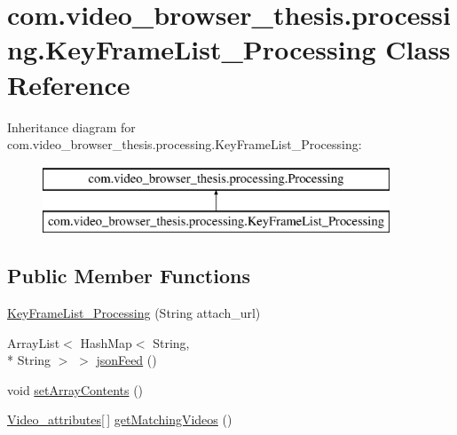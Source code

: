\hypertarget{classcom_1_1video__browser__thesis_1_1processing_1_1_key_frame_list___processing}{\section{com.\-video\-\_\-browser\-\_\-thesis.\-processing.\-Key\-Frame\-List\-\_\-\-Processing Class Reference}
\label{classcom_1_1video__browser__thesis_1_1processing_1_1_key_frame_list___processing}
}
Inheritance diagram for com.\-video\-\_\-browser\-\_\-thesis.\-processing.\-Key\-Frame\-List\-\_\-\-Processing\-:\begin{figure}[H]
\begin{center}
\leavevmode
\includegraphics[height=2.000000cm]{classcom_1_1video__browser__thesis_1_1processing_1_1_key_frame_list___processing}
\end{center}
\end{figure}
\subsection*{Public Member Functions}
\begin{DoxyCompactItemize}
\item 
\hyperlink{classcom_1_1video__browser__thesis_1_1processing_1_1_key_frame_list___processing_aa997cba0b20aceb81bff4f6ff3ee2822}{Key\-Frame\-List\-\_\-\-Processing} (String attach\-\_\-url)
\item 
Array\-List$<$ Hash\-Map$<$ String, \\*
String $>$ $>$ \hyperlink{classcom_1_1video__browser__thesis_1_1processing_1_1_key_frame_list___processing_a043be842a8cda34fd7f80025fb13e7ce}{json\-Feed} ()
\item 
void \hyperlink{classcom_1_1video__browser__thesis_1_1processing_1_1_key_frame_list___processing_ac86e187eb01b3c5d9224bb2139b0979d}{set\-Array\-Contents} ()
\item 
\hyperlink{classcom_1_1video__browser__thesis_1_1elements_1_1_video__attributes}{Video\-\_\-attributes}\mbox{[}$\,$\mbox{]} \hyperlink{classcom_1_1video__browser__thesis_1_1processing_1_1_key_frame_list___processing_a722555472f5a82acf6f0921536885f6e}{get\-Matching\-Videos} ()
\end{DoxyCompactItemize}


